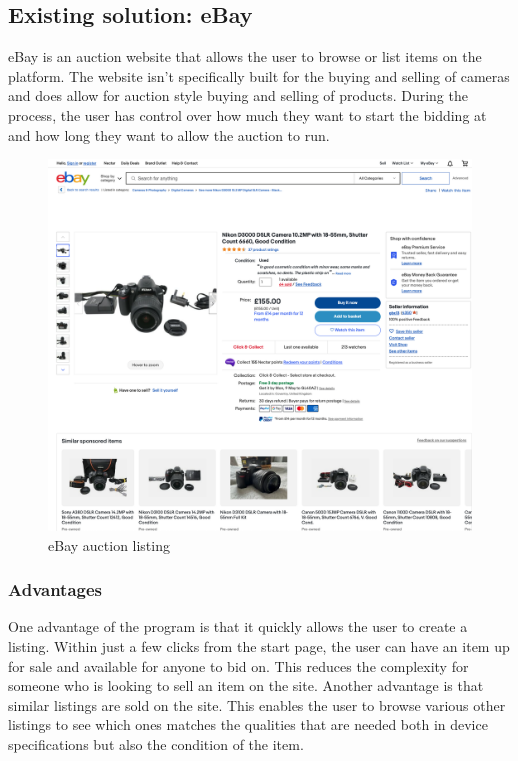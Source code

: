 \subsection{Existing solution: eBay \parencite{ebay1}}
eBay is an auction website that allows the user to browse or list items on the platform. The website isn’t specifically built for the buying and selling of cameras and does allow for auction style buying and selling of products. During the process, the user has control over how much they want to start the bidding at and how long they want to allow the auction to run.
\begin{figure}[H]
    \centering
    \includegraphics[scale=0.3]{ch1_analysis/ebay_listing.png}
    \caption{eBay auction listing}
    \label{fig:ch1_ebay}
\end{figure}
\subsubsection{Advantages}
One advantage of the program is that it quickly allows the user to create a listing. Within just a few clicks from the start page, the user can have an item up for sale and available for anyone to bid on. This reduces the complexity for someone who is looking to sell an item on the site. Another advantage is that similar listings are sold on the site. This enables the user to browse various other listings to see which ones matches the qualities that are needed both in device specifications but also the condition of the item.
